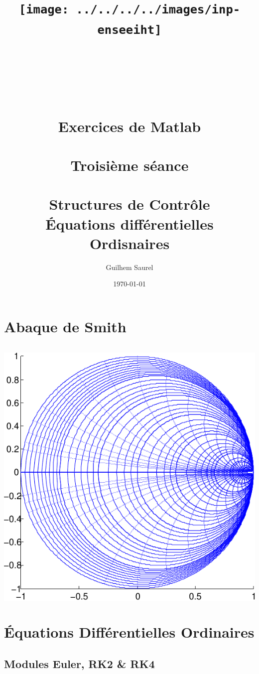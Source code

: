 \documentclass[10pt]{article}
\title{\texttt{[image: ../../../../images/inp-enseeiht]} \\ ~ \\ ~ \\ ~ \\ ~ \\ Exercices de Matlab \\ ~ \\ Troisième séance \\ ~  \\ Structures de Contrôle \\ Équations différentielles Ordisnaires}
\author{Guilhem Saurel}
\date{\today}
\begin{document}
 \begin{titlepage}
  \maketitle
  \tableofcontents
 \end{titlepage}

 \section{Abaque de Smith}
  \inputminted[linenos]{matlab}{abaque_de_smith.m}
  \begin{center}
   \includegraphics{abaque_de_smith}
  \end{center}
  \newpage

 \section{Équations Différentielles Ordinaires}
  \subsection{Modules Euler, RK2 \& RK4}
   \inputminted[linenos]{matlab}{eul.m}
   \inputminted[linenos]{matlab}{RK2.m}
   \inputminted[linenos]{matlab}{RK4.m}
\end{document}
